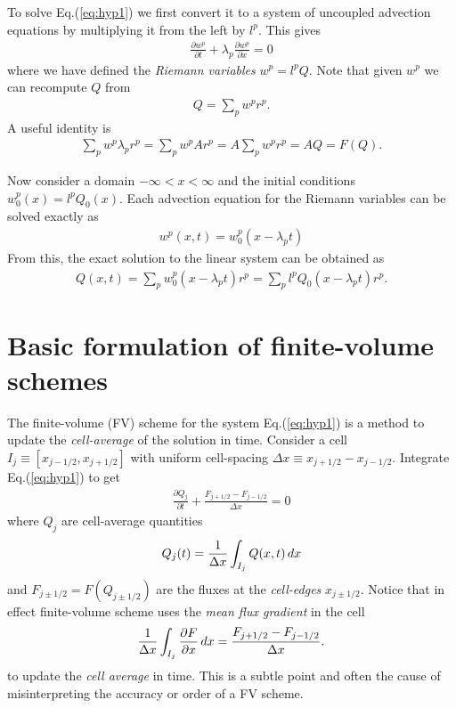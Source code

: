 \documentclass[12pt]{article}
\theoremstyle{definition}
\theoremstyle{definition}
\theoremstyle{definition}
\newcommand{\eqr}[1]{Eq.\thinspace(#1)}
\newcommand{\pfrac}[2]{\frac{\partial #1}{\partial #2}}
\begin{document}
To solve \eqr{\ref{eq:hyp1}} we first convert it to a system of
uncoupled advection equations by multiplying it from the left by
$l^p$. This gives
\begin{align}
\pfrac{w^p}{t} + \lambda_p \pfrac{w^p}{x} = 0 \label{eq:wp-advect}
\end{align}
where we have defined the \emph{Riemann variables} $w^p = l^p Q$. Note
that given $w^p$ we can recompute $Q$ from
\begin{align}
Q = \sum_p w^p r^p. \label{eq:wp-to-Q}
\end{align}
A useful identity is
\begin{align}
\sum_p w^p \lambda_p r^p = \sum_p w^p A r^p = A \sum_p w^p r^p = AQ = F(Q). \label{eq:wp-ident1}
\end{align}

Now consider a domain $-\infty < x < \infty$ and the initial
conditions $w^p_0(x) = l^p Q_0(x)$. Each advection equation for the
Riemann variables can be solved exactly as
\begin{align}
w^p(x,t) = w^p_0(x-\lambda_p t)
\end{align}
From this, the exact solution to the linear system can be obtained as
\begin{align}
Q(x,t) = \sum_p w^p_0(x-\lambda_p t) r^p = \sum_p l^p Q_0(x-\lambda_p t) r^p.
\end{align}

\section{Basic formulation of finite-volume schemes}

The finite-volume (FV) scheme for the system \eqr{\ref{eq:hyp1}} is a
method to update the \emph{cell-average} of the solution in
time. Consider a cell $I_j \equiv [x_{j-1/2},x_{j+1/2}]$ with uniform
cell-spacing $\Delta x \equiv x_{j+1/2}-x_{j-1/2}$. Integrate
\eqr{\ref{eq:hyp1}} to get
\begin{align}
  \pfrac{Q_j}{t} + \frac{F_{j+1/2}-F_{j-1/2}}{\Delta x} = 0
  \label{eq:fv-exact}
\end{align}
where $Q_j$ are cell-average quantities
\begin{align}
  Q_j(t) = \frac{1}{\Delta x}\int_{I_j} Q(x,t) \thinspace dx
\end{align}
and $F_{j\pm 1/2} = F(Q_{j\pm 1/2})$ are the fluxes at the
\emph{cell-edges} $x_{j\pm 1/2}$. Notice that in effect finite-volume
scheme uses the \emph{mean flux gradient} in the cell
\begin{align}
  \frac{1}{\Delta x}\int_{I_j} \pfrac{F}{x} \thinspace dx =
  \frac{F_{j+1/2}-F_{j-1/2}}{\Delta x}.
\end{align}
to update the \emph{cell average} in time. This is a subtle point and
often the cause of misinterpreting the accuracy or order of a FV
scheme.
\end{document}
